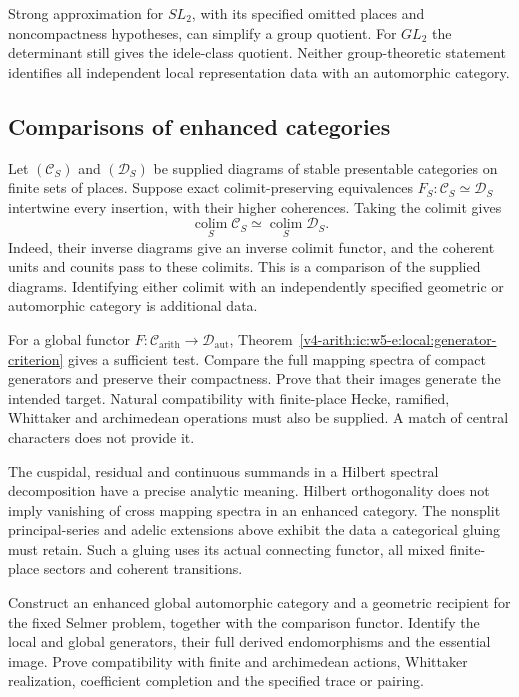 Strong approximation for \(SL_2\), with its specified omitted
places and noncompactness hypotheses, can simplify a group quotient.
For \(GL_2\) the determinant still gives the idele-class quotient.
Neither group-theoretic statement identifies all independent
local representation data with an automorphic category.

\subsection{Comparisons of enhanced categories}

Let \((\mathcal C_S)\) and \((\mathcal D_S)\) be supplied diagrams
of stable presentable categories on finite sets of places.
Suppose exact colimit-preserving equivalences
\(F_S:\mathcal C_S\simeq\mathcal D_S\) intertwine every insertion,
with their higher coherences.
Taking the colimit gives
\[
 \operatorname*{colim}_S\mathcal C_S
      \simeq\operatorname*{colim}_S\mathcal D_S.
\]
Indeed, their inverse diagrams give an inverse colimit functor,
and the coherent units and counits pass to these colimits.
This is a comparison of the supplied diagrams.
Identifying either colimit with an independently specified
geometric or automorphic category is additional data.

For a global functor
\(F:\mathcal C_{\mathrm{arith}}\to\mathcal D_{\mathrm{aut}}\),
Theorem~\ref{v4-arith:ic:w5-e:local:generator-criterion}
gives a sufficient test. Compare the full mapping spectra of
compact generators and preserve their compactness.
Prove that their images generate the intended target.
Natural compatibility with finite-place Hecke, ramified,
Whittaker and archimedean operations must also be supplied.
A match of central characters does not provide it.

The cuspidal, residual and continuous summands in a Hilbert
spectral decomposition have a precise analytic meaning.
Hilbert orthogonality does not imply vanishing of cross mapping
spectra in an enhanced category.
The nonsplit principal-series and adelic extensions above
exhibit the data a categorical gluing must retain.
Such a gluing uses its actual connecting functor, all mixed
finite-place sectors and coherent transitions.

\begin{question}\label{v4-arith:ic:global-comparison}
Construct an enhanced global automorphic category and a geometric
recipient for the fixed Selmer problem, together with the
comparison functor. Identify the local and global generators,
their full derived endomorphisms and the essential image.
Prove compatibility with finite and archimedean actions,
Whittaker realization, coefficient completion and the specified
trace or pairing.
\end{question}

